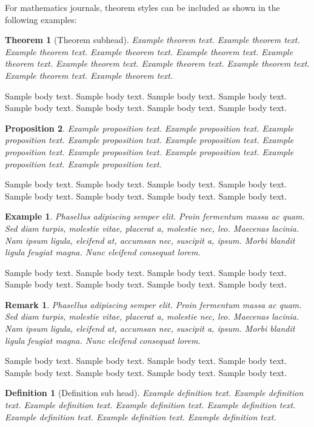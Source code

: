 \documentclass[pdflatex,sn-mathphys-num]{sn-jnl}%
\theoremstyle{thmstyleone}%
\newtheorem{theorem}{Theorem}%
\newtheorem{proposition}[theorem]{Proposition}%
\theoremstyle{thmstyletwo}%
\newtheorem{example}{Example}%
\newtheorem{remark}{Remark}%
\theoremstyle{thmstylethree}%
\newtheorem{definition}{Definition}%
\begin{document}
For mathematics journals, theorem styles can be included as shown in the following examples:

\begin{theorem}[Theorem subhead]\label{thm1}
Example theorem text. Example theorem text. Example theorem text. Example theorem text. Example theorem text. 
Example theorem text. Example theorem text. Example theorem text. Example theorem text. Example theorem text. 
Example theorem text. 
\end{theorem}

Sample body text. Sample body text. Sample body text. Sample body text. Sample body text. Sample body text. Sample body text. Sample body text.

\begin{proposition}
Example proposition text. Example proposition text. Example proposition text. Example proposition text. Example proposition text. 
Example proposition text. Example proposition text. Example proposition text. Example proposition text. Example proposition text. 
\end{proposition}

Sample body text. Sample body text. Sample body text. Sample body text. Sample body text. Sample body text. Sample body text. Sample body text.

\begin{example}
Phasellus adipiscing semper elit. Proin fermentum massa
ac quam. Sed diam turpis, molestie vitae, placerat a, molestie nec, leo. Maecenas lacinia. Nam ipsum ligula, eleifend
at, accumsan nec, suscipit a, ipsum. Morbi blandit ligula feugiat magna. Nunc eleifend consequat lorem. 
\end{example}

Sample body text. Sample body text. Sample body text. Sample body text. Sample body text. Sample body text. Sample body text. Sample body text.

\begin{remark}
Phasellus adipiscing semper elit. Proin fermentum massa
ac quam. Sed diam turpis, molestie vitae, placerat a, molestie nec, leo. Maecenas lacinia. Nam ipsum ligula, eleifend
at, accumsan nec, suscipit a, ipsum. Morbi blandit ligula feugiat magna. Nunc eleifend consequat lorem. 
\end{remark}

Sample body text. Sample body text. Sample body text. Sample body text. Sample body text. Sample body text. Sample body text. Sample body text.

\begin{definition}[Definition sub head]
Example definition text. Example definition text. Example definition text. Example definition text. Example definition text. Example definition text. Example definition text. Example definition text. 
\end{definition}
\end{document}
